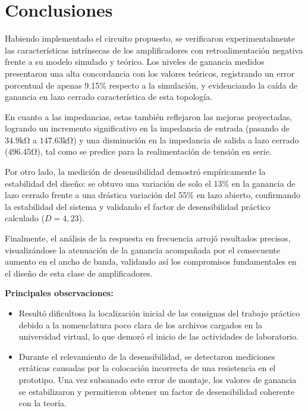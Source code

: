\chapter{Conclusiones}

Habiendo implementado el circuito propuesto, se verificaron experimentalmente las características intrínsecas de los
amplificadores con retroalimentación negativa frente a su modelo simulado y teórico. Los niveles de ganancia medidos presentaron
una alta concordancia con los valores teóricos, registrando un error porcentual de apenas 9.15\% respecto a la
simulación, y evidenciando la caída de ganancia en lazo cerrado característica de esta topología.

En cuanto a las impedancias, estas también reflejaron las mejoras proyectadas, logrando un incremento significativo en la 
impedancia de entrada (pasando de $34.9 \si{\kilo\ohm}$ a $147.63 \si{\kilo\ohm}$) y una disminución en la impedancia de salida 
a lazo cerrado ($496.45 \si{\ohm}$), tal como se predice para la realimentación de tensión en serie.

Por otro lado, la medición de desensibilidad demostró empíricamente la estabilidad del diseño: se obtuvo una variación
de solo el 13\% en la ganancia de lazo cerrado frente a una drástica variación del 55\% en lazo abierto, confirmando la
estabilidad del sistema y validando el factor de desensibilidad práctico calculado ($D = 4,23$).

Finalmente, el análisis de la respuesta en frecuencia arrojó resultados precisos, visualizándose la atenuación de la
ganancia acompañada por el consecuente aumento en el ancho de banda, validando así los compromisos fundamentales en el
diseño de esta clase de amplificadores.

\vspace{1cm}
\noindent\textbf{Principales observaciones:}
\begin{itemize}
    \item Resultó dificultosa la localización inicial de las consignas del trabajo práctico debido a la nomenclatura poco 
    clara de los archivos cargados en la universidad virtual, lo que demoró el inicio de las actividades de laboratorio.
    \item Durante el relevamiento de la desensibilidad, se detectaron mediciones erráticas causadas por la colocación 
    incorrecta de una resistencia en el prototipo. Una vez subsanado este error de montaje, los valores de ganancia se 
    estabilizaron y permitieron obtener un factor de desensibilidad coherente con la teoría.
\end{itemize}
